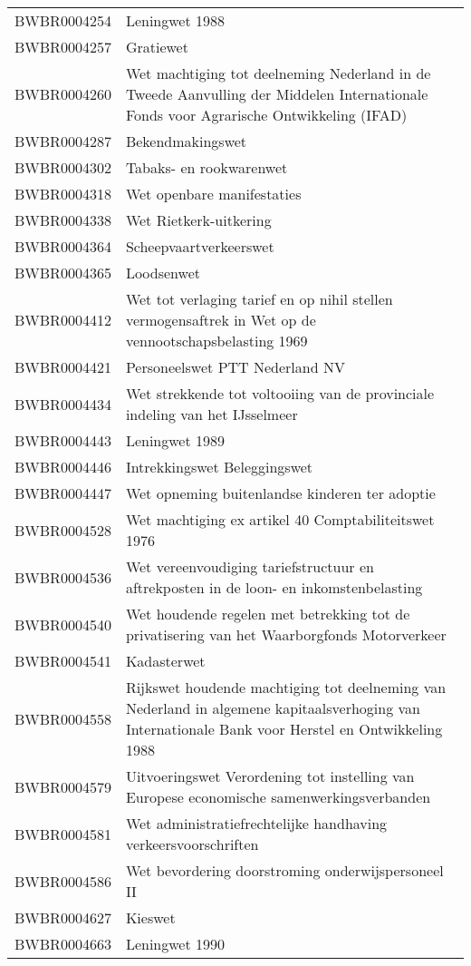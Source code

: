 \begin{longtable}{lp{}}
BWBR0004254 & Leningwet 1988 \\
BWBR0004257 & Gratiewet \\
BWBR0004260 & Wet machtiging tot deelneming Nederland in de Tweede Aanvulling der Middelen Internationale Fonds voor Agrarische Ontwikkeling (IFAD) \\
BWBR0004287 & Bekendmakingswet \\
BWBR0004302 & Tabaks- en rookwarenwet \\
BWBR0004318 & Wet openbare manifestaties \\
BWBR0004338 & Wet Rietkerk-uitkering \\
BWBR0004364 & Scheepvaartverkeerswet \\
BWBR0004365 & Loodsenwet \\
BWBR0004412 & Wet tot verlaging tarief en op nihil stellen vermogensaftrek in Wet op de vennootschapsbelasting 1969 \\
BWBR0004421 & Personeelswet PTT Nederland NV \\
BWBR0004434 & Wet strekkende tot voltooiing van de provinciale indeling van het IJsselmeer \\
BWBR0004443 & Leningwet 1989 \\
BWBR0004446 & Intrekkingswet Beleggingswet \\
BWBR0004447 & Wet opneming buitenlandse kinderen ter adoptie \\
BWBR0004528 & Wet machtiging ex artikel 40 Comptabiliteitswet 1976 \\
BWBR0004536 & Wet vereenvoudiging tariefstructuur en aftrekposten in de loon- en inkomstenbelasting \\
BWBR0004540 & Wet houdende regelen met betrekking tot de privatisering van het Waarborgfonds Motorverkeer \\
BWBR0004541 & Kadasterwet \\
BWBR0004558 & Rijkswet houdende machtiging tot deelneming van Nederland in algemene kapitaalsverhoging van Internationale Bank voor Herstel en Ontwikkeling 1988 \\
BWBR0004579 & Uitvoeringswet Verordening tot instelling van Europese economische samenwerkingsverbanden \\
BWBR0004581 & Wet administratiefrechtelijke handhaving verkeersvoorschriften \\
BWBR0004586 & Wet bevordering doorstroming onderwijspersoneel II \\
BWBR0004627 & Kieswet \\
BWBR0004663 & Leningwet 1990 \\

\end{longtable}
